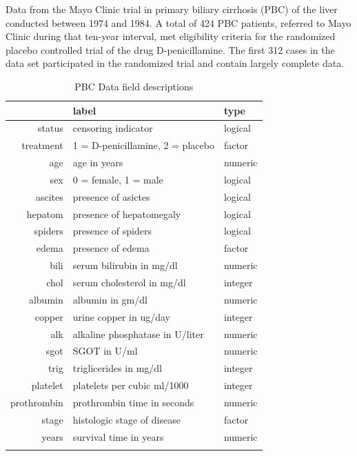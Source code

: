\documentclass[nojss]{jss}\usepackage[]{graphicx}\usepackage[]{color}
\begin{document}
Data from the Mayo Clinic trial in primary biliary cirrhosis (PBC) of the liver conducted between 1974 and 1984. A total of 424 PBC patients, referred to Mayo Clinic during that ten-year interval, met eligibility criteria for the randomized placebo controlled trial of the drug D-penicillamine. The first 312 cases in the data set participated in the randomized trial and contain largely complete data.



\begin{table}[ht]
\centering
{\footnotesize
\begin{tabular}{rll}
  \toprule
 & label & type \\ 
  \midrule
status & censoring indicator & logical \\ 
   \rowcolor[gray]{0.95}treatment & 1 = D-penicillamine, 2 = placebo & factor \\ 
  age & age in years & numeric \\ 
   \rowcolor[gray]{0.95}sex & 0 = female, 1 = male & logical \\ 
  ascites & presence of asictes & logical \\ 
   \rowcolor[gray]{0.95}hepatom & presence of hepatomegaly & logical \\ 
  spiders & presence of spiders & logical \\ 
   \rowcolor[gray]{0.95}edema & presence of edema & factor \\ 
  bili & serum bilirubin in mg/dl & numeric \\ 
   \rowcolor[gray]{0.95}chol & serum cholesterol in mg/dl & integer \\ 
  albumin & albumin in gm/dl & numeric \\ 
   \rowcolor[gray]{0.95}copper & urine copper in ug/day & integer \\ 
  alk & alkaline phosphatase in U/liter & numeric \\ 
   \rowcolor[gray]{0.95}sgot & SGOT in U/ml & numeric \\ 
  trig & triglicerides in mg/dl & integer \\ 
   \rowcolor[gray]{0.95}platelet & platelets per cubic ml/1000 & integer \\ 
  prothrombin & prothrombin time in seconds & numeric \\ 
   \rowcolor[gray]{0.95}stage & histologic stage of disease & factor \\ 
  years & survival time in years & numeric \\ 
   \rowcolor[gray]{0.95} \bottomrule
\end{tabular}
}
\caption{PBC Data field descriptions} 
\label{T:dataLabs}
\end{table}
\end{document}
